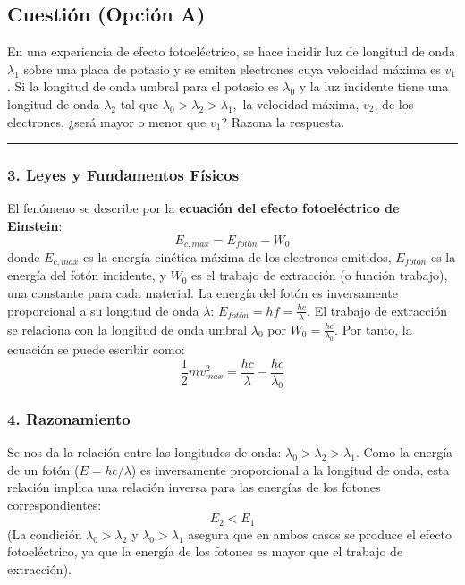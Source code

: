 \newpage

\subsection{Cuestión (Opción A)}
\label{subsec:A6_2016_jun_ord_re}

\begin{cajaenunciado}
En una experiencia de efecto fotoeléctrico, se hace incidir luz de longitud de onda $\lambda_{1}$ sobre una placa de potasio y se emiten electrones cuya velocidad máxima es $v_{1}$. Si la longitud de onda umbral para el potasio es $\lambda_{0}$ y la luz incidente tiene una longitud de onda $\lambda_{2}$ tal que $\lambda_{0}>\lambda_{2}>\lambda_{1},$ la velocidad máxima, $v_{2}$, de los electrones, ¿será mayor o menor que $v_{1}$? Razona la respuesta.
\end{cajaenunciado}
\hrule

\subsubsection*{3. Leyes y Fundamentos Físicos}
El fenómeno se describe por la \textbf{ecuación del efecto fotoeléctrico de Einstein}:
$$ E_{c,max} = E_{fotón} - W_0 $$
donde $E_{c,max}$ es la energía cinética máxima de los electrones emitidos, $E_{fotón}$ es la energía del fotón incidente, y $W_0$ es el trabajo de extracción (o función trabajo), una constante para cada material.
La energía del fotón es inversamente proporcional a su longitud de onda $\lambda$: $E_{fotón} = hf = \frac{hc}{\lambda}$.
El trabajo de extracción se relaciona con la longitud de onda umbral $\lambda_0$ por $W_0 = \frac{hc}{\lambda_0}$.
Por tanto, la ecuación se puede escribir como:
$$ \frac{1}{2}mv_{max}^2 = \frac{hc}{\lambda} - \frac{hc}{\lambda_0} $$

\subsubsection*{4. Razonamiento}
Se nos da la relación entre las longitudes de onda: $\lambda_0 > \lambda_2 > \lambda_1$.
Como la energía de un fotón ($E = hc/\lambda$) es inversamente proporcional a la longitud de onda, esta relación implica una relación inversa para las energías de los fotones correspondientes:
$$ E_2 < E_1 $$
(La condición $\lambda_0 > \lambda_2$ y $\lambda_0 > \lambda_1$ asegura que en ambos casos se produce el efecto fotoeléctrico, ya que la energía de los fotones es mayor que el trabajo de extracción).

